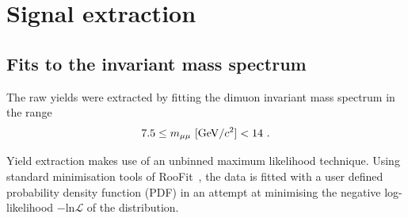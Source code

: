 \section{Signal extraction}
 \label{sec:sigext}

\subsection{Fits to the invariant mass spectrum}
 \label{sec:sigext_fits}
The raw yields were extracted by fitting the dimuon invariant mass spectrum in the range 
\begin{equation}
7.5 \leq m_{\mu\mu}\ [{\rm GeV}/c^2] < 14\ . \nonumber
\end{equation}


Yield extraction makes use of an unbinned maximum likelihood
technique. Using standard minimisation tools of
RooFit~\cite{Verkerke:2003ir}, the data is fitted with a user defined
probability density function (PDF) in an attempt at minimising the
negative log-likelihood $-\textrm{ln}\mathcal{L}$ of the distribution. %

